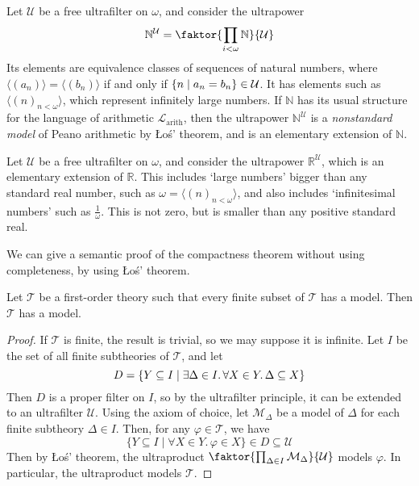 \begin{example}
    Let \( \mathcal U \) be a free ultrafilter on \( \omega \), and consider the ultrapower
    \[ \mathbb N^{\mathcal U} = \faktor{\prod_{i < \omega} \mathbb N}{\mathcal U} \]
    Its elements are equivalence classes of sequences of natural numbers, where \( \langle(a_n)\rangle = \langle(b_n)\rangle \) if and only if \( \qty{n \mid a_n = b_n} \in \mathcal U \).
    It has elements such as \( \langle (n)_{n < \omega} \rangle \), which represent infinitely large numbers.
    If \( \mathbb N \) has its usual structure for the language of arithmetic \( \mathcal L_{\text{arith}} \), then the ultrapower \( \mathbb N^{\mathcal U} \) is a \emph{nonstandard model} of Peano arithmetic by \L{}o\'s' theorem, and is an elementary extension of \( \mathbb N \).
\end{example}
\begin{example}
    Let \( \mathcal U \) be a free ultrafilter on \( \omega \), and consider the ultrapower \( \mathbb R^{\mathcal U} \), which is an elementary extension of \( \mathbb R \).
    This includes `large numbers' bigger than any standard real number, such as \( \omega = \langle (n)_{n < \omega} \rangle \), and also includes `infinitesimal numbers' such as \( \frac{1}{\omega} \).
    This is not zero, but is smaller than any positive standard real.
\end{example}
We can give a semantic proof of the compactness theorem without using completeness, by using \L{}o\'s' theorem.
\begin{corollary}
    Let \( \mathcal T \) be a first-order theory such that every finite subset of \( \mathcal T \) has a model.
    Then \( \mathcal T \) has a model.
\end{corollary}
\begin{proof}
    If \( \mathcal T \) is finite, the result is trivial, so we may suppose it is infinite.
    Let \( I \) be the set of all finite subtheories of \( \mathcal T \), and let
    \[ D = \qty{Y \subseteq I \mid \exists \Delta \in I.\, \forall X \in Y.\, \Delta \subseteq X} \]
    Then \( D \) is a proper filter on \( I \), so by the ultrafilter principle, it can be extended to an ultrafilter \( \mathcal U \).
    Using the axiom of choice, let \( \mathcal M_\Delta \) be a model of \( \Delta \) for each finite subtheory \( \Delta \in I \).
    Then, for any \( \varphi \in \mathcal T \), we have
    \[ \{ Y \subseteq I \mid \forall X \in Y.\, \varphi \in X \} \in D \subseteq \mathcal U \]
    Then by \L{}o\'s' theorem, the ultraproduct \( \faktor{\prod_{\Delta \in I} \mathcal M_\Delta}{\mathcal U} \) models \( \varphi \).
    In particular, the ultraproduct models \( \mathcal T \).
\end{proof}
